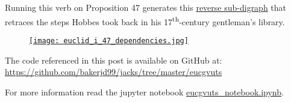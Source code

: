 Running this verb on Proposition 47 generates this
\href{https://bakerjd99.files.wordpress.com/2023/06/euclid_i_47_dependencies-1.pdf}{reverse
sub-digraph} that retraces the steps Hobbes took back in his
17\textsuperscript{th}-century gentleman's library.

\captionsetup[figure]{labelformat=empty}
\begin{figure}[htbp]
\centering
\href{https://bakerjd99.files.wordpress.com/2023/06/euclid_i_47_dependencies.jpg}{\texttt{[image: euclid\_i\_47\_dependencies.jpg]}}
\caption[Proposition 47 dependencies]{}
\label{fig:7864x0}
\end{figure}

The code referenced in this post is available on GitHub at:
\url{https://github.com/bakerjd99/jacks/tree/master/eucgvuts}

For more information read the jupyter notebook \href{https://github.com/bakerjd99/jacks/blob/master/eucgvuts/eucgvuts_notebook.ipynb}{eucgvuts\_notebook.ipynb}.

%
